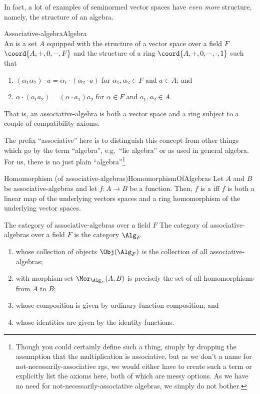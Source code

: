 In fact, a lot of examples of seminormed vector spaces have \emph{even more} structure, namely, the structure of an algebra.
\begin{dfn}{Associative-algebra}{Algebra}
\\
An  is a set $A$ equipped with the structure of a vector space over a field $F$ $\coord{A,+,0,-,F}$ and the structure of a ring $\coord{A,+,0,-,\cdot ,1}$ such that
\begin{enumerate}
\item $(\alpha _1\alpha _2)\cdot a=\alpha _1\cdot (\alpha _2\cdot a)$ for $\alpha _1,\alpha _2\in F$ and $a\in A$; and
\item $\alpha \cdot (a_1a_2)=(\alpha \cdot a_1)a_2$ for $\alpha \in F$ and $a_1,a_2\in A$.
\end{enumerate}
\begin{rmk}
That is, an associative-algebra is both a vector space and a ring subject to a couple of compatibility axioms.
\end{rmk}
\begin{rmk}
The prefix ``associative'' here is to distinguish this concept from other things which go by the term ``algebra'', e.g.~``lie algebra'' or as used in general algebra.  For us, there is no just plain ``algebra''\footnote{Though you could certainly define such a thing, simply by dropping the assumption that the multiplication is associative, but as we don't a name for not-necessarily-associative rgs, we would either have to create such a term or explicitly list the axioms here, both of which are messy options.  As we have no need for not-necessarily-associative algebras, we simply do not bother.}
\end{rmk}
\end{dfn}
\begin{dfn}{Homomorphism (of associative-algebras)}{HomomorphismOfAlgebras}
Let $A$ and $B$ be associative-algebras and let $f\colon A\rightarrow B$ be a function.  Then, $f$ is a  iff $f$ is both a linear map of the underlying vectors spaces and a ring homomorphism of the underlying vector spaces.
\end{dfn}
\begin{exm}{The category of associative-algebras over a field $F$}{}
The category of associative-algebras over a field $F$ is the category $\Alg _F$
\begin{enumerate}
\item whose collection of objects $\Obj (\Alg _F )$ is the collection of all associative-algebras;
\item with morphism set $\Mor _{\Alg _F}(A,B)$ is precisely the set of all homomorphisms from $A$ to $B$;
\item whose composition is given by ordinary function composition; and
\item whose identities are given by the identity functions.
\end{enumerate}
\end{exm}
